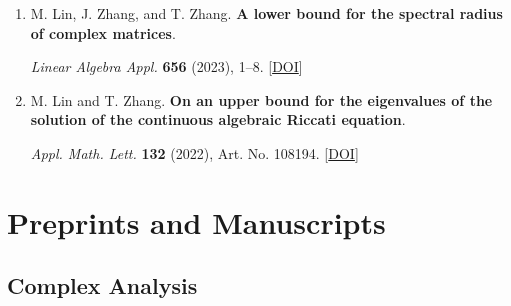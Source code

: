 \documentclass[11pt,letterpaper]{article}
\let\originalsection\section
\renewcommand{\section}[1]{\Needspace{7\baselineskip}\originalsection{#1}}
\begin{document}
\begin{enumerate}[resume*=published]
\item \begin{minipage}[t]{\linewidth}\raggedright M. Lin, J. Zhang, and T. Zhang. \textbf{A lower bound for the spectral radius of complex matrices}.\par \textit{Linear Algebra Appl.} \textbf{656} (2023), 1--8. [\href{https://doi.org/10.1016/j.laa.2022.09.012}{DOI}]\end{minipage}

\item \begin{minipage}[t]{\linewidth}\raggedright M. Lin and T. Zhang. \textbf{On an upper bound for the eigenvalues of the solution of the continuous algebraic Riccati equation}.\par \textit{Appl. Math. Lett.} \textbf{132} (2022), Art. No. 108194. [\href{https://doi.org/10.1016/j.aml.2022.108194}{DOI}]\end{minipage}

\end{enumerate}

\section{Preprints and Manuscripts}

\subsection{Complex Analysis}
\end{document}
